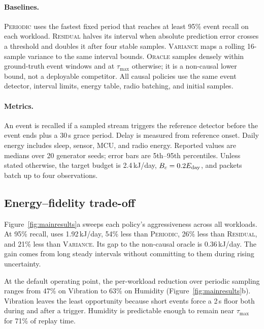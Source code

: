 \paragraph{Baselines.}
\textsc{Periodic} uses the fastest fixed period that reaches at least 95\%
event recall on each workload.  \textsc{Residual} halves its interval when
absolute prediction error crosses a threshold and doubles it after four stable
samples.  \textsc{Variance} maps a rolling 16-sample variance to the same
interval bounds.  \textsc{Oracle} samples densely within ground-truth event
windows and at $\tau_{\max}$ otherwise; it is a non-causal lower bound, not a
deployable competitor.  All causal policies use the same event detector,
interval limits, energy table, radio batching, and initial samples.

\paragraph{Metrics.}
An event is recalled if a sampled stream triggers the reference detector before
the event ends plus a 30\,s grace period.  Delay is measured from reference
onset.  Daily energy includes sleep, sensor, MCU, and radio energy.  Reported
values are medians over 20 generator seeds; error bars are 5th--95th
percentiles.  Unless stated otherwise, the target budget is 2.4\,kJ/day,
$B_c=0.2E_{\mathrm{day}}$, and packets batch up to four observations.

\subsection{Energy--fidelity trade-off}

Figure~\ref{fig:mainresults}a sweeps each policy's aggressiveness across all
workloads.  At 95\% recall, \system uses 1.92\,kJ/day, 54\% less than
\textsc{Periodic}, 26\% less than \textsc{Residual}, and 21\% less than
\textsc{Variance}.  Its gap to the non-causal oracle is 0.36\,kJ/day.  The gain
comes from long steady intervals without committing to them during rising
uncertainty.

At the default operating point, the per-workload reduction over periodic
sampling ranges from 47\% on Vibration to 63\% on Humidity
(Figure~\ref{fig:mainresults}b).  Vibration leaves the least opportunity because
short events force a 2\,s floor both during and after a trigger.  Humidity is
predictable enough to remain near $\tau_{\max}$ for 71\% of replay time.

